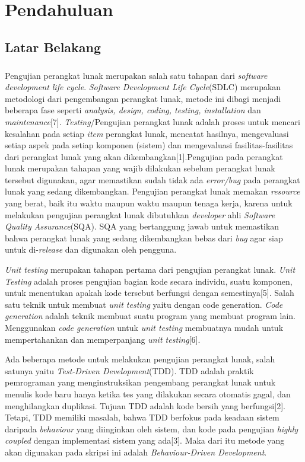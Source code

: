\chapter{Pendahuluan}
\label{chap:intro}
   
\section{Latar Belakang}
\label{sec:label}
\paragraph{}
Pengujian perangkat lunak merupakan salah satu tahapan dari \textit{software development life cycle}. \textit{Software Development Life Cycle}(SDLC) merupakan metodologi dari pengembangan perangkat lunak, metode ini dibagi menjadi beberapa fase seperti\textit{ analysis, design,  coding,  testing, installation} dan \textit{maintenance}[7]. \textit{Testing}/Pengujian perangkat lunak adalah proses untuk mencari kesalahan pada setiap \textit{item} perangkat lunak, mencatat hasilnya, mengevaluasi setiap aspek pada setiap komponen (sistem) dan mengevaluasi fasilitas-fasilitas dari perangkat lunak yang akan dikembangkan[1].Pengujian pada perangkat lunak merupakan tahapan yang wajib dilakukan sebelum perangkat lunak tersebut digunakan, agar memastikan sudah tidak ada \textit{error/bug} pada perangkat lunak yang sedang dikembangkan. Pengujian perangkat lunak memakan \textit{resource} yang berat, baik itu waktu maupun waktu maupun tenaga kerja, karena untuk melakukan pengujian perangkat lunak dibutuhkan \textit{developer} ahli \textit{Software Quality Assurance}(SQA). SQA yang bertanggung jawab untuk memastikan bahwa perangkat lunak yang sedang dikembangkan bebas dari \textit{bug} agar siap untuk di-\textit{release} dan digunakan oleh pengguna.

\textit{Unit testing} merupakan tahapan pertama dari pengujian perangkat lunak. \textit{Unit Testing} adalah proses pengujian bagian kode secara individu, suatu komponen, untuk menentukan apakah kode tersebut berfungsi dengan semestinya[5]. Salah satu teknik untuk membuat \textit{unit testing} yaitu dengan code generation. \textit{Code generation} adalah teknik membuat suatu program yang membuat program lain. Menggunakan \textit{code generation} untuk \textit{unit testing} membuatnya mudah untuk mempertahankan dan memperpanjang \textit{unit testing}[6].

Ada beberapa metode untuk melakukan pengujian perangkat lunak, salah satunya yaitu \textit{Test-Driven Development}(TDD). TDD adalah praktik pemrograman yang menginstruksikan pengembang perangkat lunak untuk menulis kode baru hanya ketika tes yang dilakukan secara otomatis gagal, dan menghilangkan duplikasi. Tujuan TDD adalah kode bersih yang berfungsi[2]. Tetapi, TDD memiliki masalah, bahwa TDD berfokus pada keadaan sistem daripada \textit{behaviour} yang diinginkan oleh sistem, dan kode pada pengujian \textit{highly coupled} dengan implementasi sistem yang ada[3]. Maka dari itu metode yang akan digunakan pada skripsi ini adalah \textit{Behaviour-Driven Development}.

